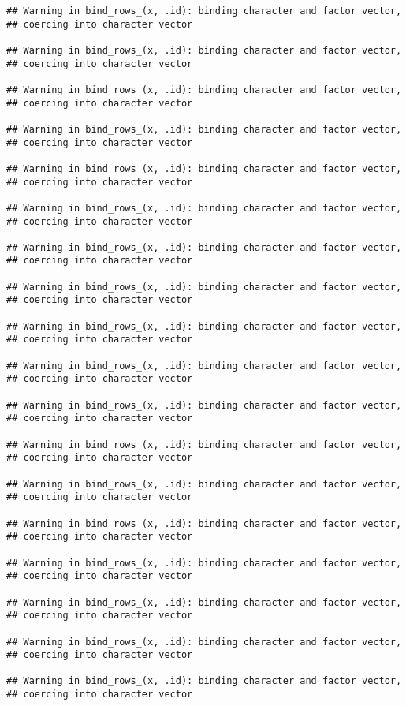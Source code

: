 \documentclass[]{article}
\begin{document}
\begin{verbatim}
## Warning in bind_rows_(x, .id): binding character and factor vector,
## coercing into character vector

## Warning in bind_rows_(x, .id): binding character and factor vector,
## coercing into character vector

## Warning in bind_rows_(x, .id): binding character and factor vector,
## coercing into character vector

## Warning in bind_rows_(x, .id): binding character and factor vector,
## coercing into character vector

## Warning in bind_rows_(x, .id): binding character and factor vector,
## coercing into character vector

## Warning in bind_rows_(x, .id): binding character and factor vector,
## coercing into character vector

## Warning in bind_rows_(x, .id): binding character and factor vector,
## coercing into character vector

## Warning in bind_rows_(x, .id): binding character and factor vector,
## coercing into character vector

## Warning in bind_rows_(x, .id): binding character and factor vector,
## coercing into character vector

## Warning in bind_rows_(x, .id): binding character and factor vector,
## coercing into character vector

## Warning in bind_rows_(x, .id): binding character and factor vector,
## coercing into character vector

## Warning in bind_rows_(x, .id): binding character and factor vector,
## coercing into character vector

## Warning in bind_rows_(x, .id): binding character and factor vector,
## coercing into character vector

## Warning in bind_rows_(x, .id): binding character and factor vector,
## coercing into character vector

## Warning in bind_rows_(x, .id): binding character and factor vector,
## coercing into character vector

## Warning in bind_rows_(x, .id): binding character and factor vector,
## coercing into character vector

## Warning in bind_rows_(x, .id): binding character and factor vector,
## coercing into character vector

## Warning in bind_rows_(x, .id): binding character and factor vector,
## coercing into character vector


\end{verbatim}
\end{document}
